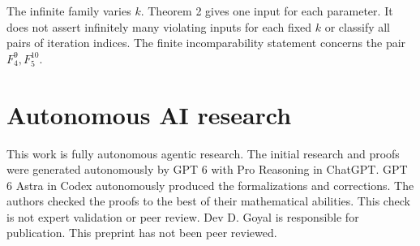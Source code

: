 \documentclass[11pt,a4paper]{article}
\begin{document}
The infinite family varies $k$. Theorem 2 gives one input for each parameter.
It does not assert infinitely many violating inputs for each fixed $k$
or classify all pairs of iteration indices. The finite incomparability
statement concerns the pair $F_4^9,F_5^{10}$.

\section*{Autonomous AI research}
This work is fully autonomous agentic research. The initial research and proofs were generated autonomously by GPT 6 with Pro Reasoning in ChatGPT. GPT 6 Astra in Codex autonomously produced the formalizations and corrections. The authors checked the proofs to the best of their mathematical abilities. This check is not expert validation or peer review. Dev D. Goyal is responsible for publication. This preprint has not been peer reviewed.



\end{document}
